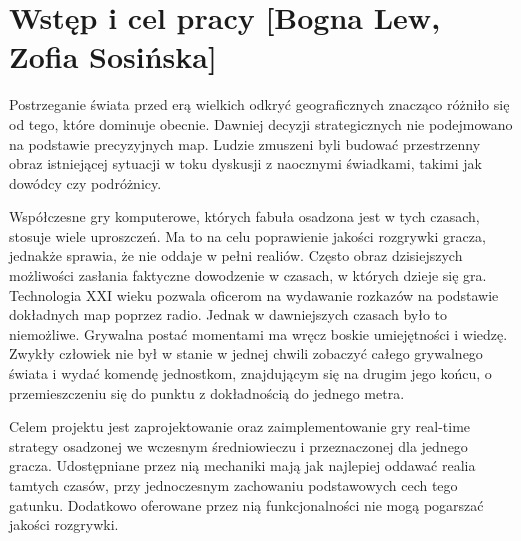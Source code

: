 \chapter{Wstęp i cel pracy [Bogna Lew, Zofia Sosińska]}\label{chap:introduction}

Postrzeganie świata przed erą wielkich odkryć geograficznych znacząco różniło się od tego, które dominuje obecnie. Dawniej
decyzji strategicznych nie podejmowano na podstawie precyzyjnych map. Ludzie zmuszeni byli  budować  przestrzenny obraz
istniejącej sytuacji  w toku dyskusji z naocznymi świadkami, takimi jak dowódcy czy podróżnicy.

Współczesne gry komputerowe, których fabuła osadzona jest w tych czasach, stosuje wiele uproszczeń. Ma to na celu poprawienie jakości
rozgrywki gracza, jednakże sprawia, że nie oddaje w pełni realiów. Często obraz dzisiejszych możliwości zasłania faktyczne dowodzenie
w czasach, w których dzieje się gra. Technologia XXI wieku pozwala oficerom na wydawanie rozkazów na podstawie dokładnych map poprzez radio.
Jednak w dawniejszych czasach było to niemożliwe. Grywalna postać momentami ma wręcz boskie umiejętności i wiedzę. Zwykły człowiek nie był w
stanie w jednej chwili zobaczyć całego grywalnego świata i wydać komendę jednostkom, znajdującym się na drugim jego końcu, o przemieszczeniu
się do punktu z dokładnością do jednego metra.

Celem projektu jest zaprojektowanie oraz zaimplementowanie gry real-time strategy osadzonej we wczesnym średniowieczu i
przeznaczonej dla jednego gracza. Udostępniane przez nią mechaniki mają jak najlepiej oddawać realia tamtych czasów, przy
jednoczesnym zachowaniu podstawowych cech tego gatunku. Dodatkowo oferowane przez nią funkcjonalności nie mogą pogarszać
jakości rozgrywki.

